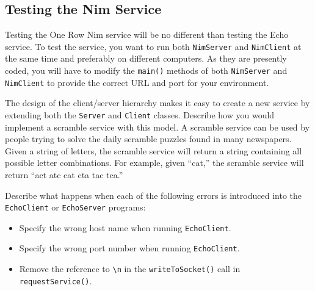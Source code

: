 
\subsection{Testing the Nim Service}
\noindent Testing the One Row Nim service will be no different
than testing the Echo service.  To test the service, you want to run
both {\tt NimServer} and {\tt NimClient} at the same time and
preferably on different computers.  As they are presently coded, you
will have to modify the {\tt main()} methods of both {\tt NimServer}
and {\tt NimClient} to provide the correct URL and port for your
environment.

\label{self-study-exercise}

\begin{SSTUDY}

\item  The design of the client/server hierarchy makes it 
easy to create a new service by extending both the {\tt Server} and
{\tt Client} classes.  Describe how you would implement a scramble
service with this model.  A scramble service can be used by people
trying to solve the daily scramble puzzles found in many newspapers.
Given a string of letters, the scramble service will return a string
containing all possible letter combinations.  For example,
given ``cat,'' the scramble service will return ``act atc cat cta tac
tca.''

\item  Describe what happens when each of the following errors is introduced
into the {\tt EchoClient} or {\tt EchoServer} programs:

\begin{itemize}
\item  Specify the wrong host name when running {\tt EchoClient}.
\item  Specify the wrong port number when running {\tt EchoClient}.
\item  Remove the reference to \verb|\n| in the {\tt writeToSocket()}
call in {\tt request\-Service()}.
\end{itemize}
\end{SSTUDY}



